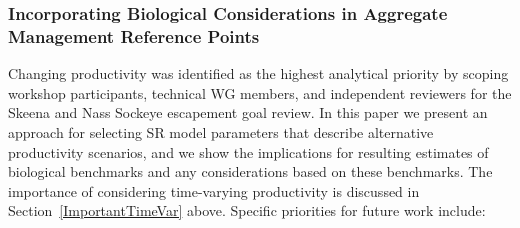 \documentclass[french,11pt]{book}
\begin{document}
\subsubsection{Incorporating Biological Considerations in Aggregate Management Reference Points}\label{incorporating-biological-considerations-in-aggregate-management-reference-points}

Changing productivity was identified as the highest analytical priority by scoping workshop participants, technical WG members, and independent reviewers for the Skeena and Nass Sockeye escapement goal review. In this paper we present an approach for selecting SR model parameters that describe alternative productivity scenarios, and we show the implications for resulting estimates of biological benchmarks and any considerations based on these benchmarks. The importance of considering time-varying productivity is discussed in Section~\ref{ImportantTimeVar} above. Specific priorities for future work include:
\end{document}
